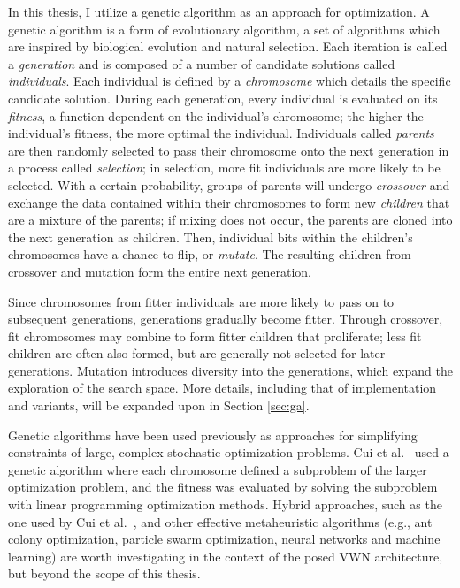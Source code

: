 \documentclass[12pt,dvipsnames]{report}
\begin{document}
%
In this thesis, I utilize a genetic algorithm as an approach for optimization.  A genetic algorithm is a form of evolutionary algorithm, a set of algorithms which are inspired by biological evolution and natural selection.  Each iteration is called a \emph{generation} and is composed of a number of candidate solutions called \emph{individuals}.  Each individual is defined by a \emph{chromosome} which details the specific candidate solution.  During each generation, every individual is evaluated on its \emph{fitness}, a function dependent on the individual's chromosome; the higher the individual's fitness, the more optimal the individual.  Individuals called \emph{parents} are then randomly selected to pass their chromosome onto the next generation in a process called \emph{selection}; in selection, more fit individuals are more likely to be selected.  With a certain probability, groups of parents will undergo \emph{crossover} and exchange the data contained within their chromosomes to form new \emph{children} that are a mixture of the parents; if mixing does not occur, the parents are cloned into the next generation as children.  Then, individual bits within the children's chromosomes have a chance to flip, or \emph{mutate}.  The resulting children from crossover and mutation form the entire next generation.

Since chromosomes from fitter individuals are more likely to pass on to subsequent generations, generations gradually become fitter.  Through crossover, fit chromosomes may combine to form fitter children that proliferate; less fit children are often also formed, but are generally not selected for later generations.  Mutation introduces diversity into the generations, which expand the exploration of the search space.  More details, including that of implementation and variants, will be expanded upon in Section \ref{sec:ga}.

Genetic algorithms have been used previously as approaches for simplifying constraints of large, complex stochastic optimization problems.  Cui et al.~\cite{7257198} used a genetic algorithm where each chromosome defined a subproblem of the larger optimization problem, and the fitness was evaluated by solving the subproblem with linear programming optimization methods.  Hybrid approaches, such as the one used by Cui et al.~\cite{7257198}, and other effective metaheuristic algorithms (e.g., ant colony optimization, particle swarm optimization, neural networks and machine learning) are worth investigating in the context of the posed VWN architecture, but beyond the scope of this thesis.
\end{document}
